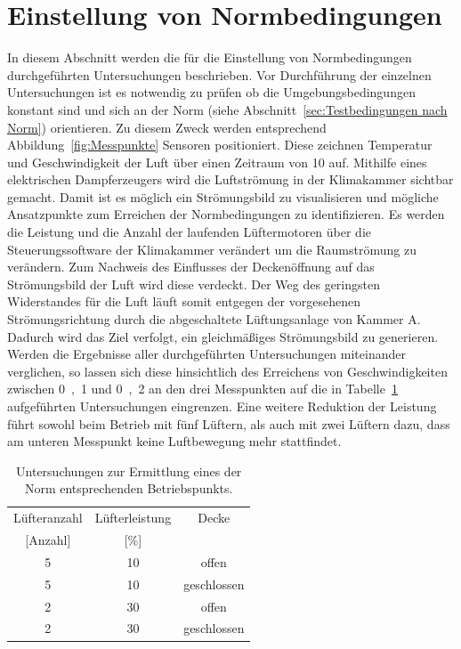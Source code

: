 \section{Einstellung von Normbedingungen}
\label{sec:EinstellungvonNormbedingungen}

In diesem Abschnitt werden die für die Einstellung von Normbedingungen durchgeführten Untersuchungen beschrieben.
Vor Durchführung der einzelnen Untersuchungen ist es notwendig zu prüfen ob die Umgebungsbedingungen konstant sind und sich an der Norm (siehe Abschnitt~\ref{sec:Testbedingungen nach Norm}) orientieren. Zu diesem Zweck werden entsprechend Abbildung~\ref{fig:Messpunkte} Sensoren positioniert. Diese zeichnen Temperatur und Geschwindigkeit der Luft über einen Zeitraum von \unit{10}{\min} auf. Mithilfe eines elektrischen Dampferzeugers wird die Luftströmung in der Klimakammer sichtbar gemacht. Damit ist es möglich ein Strömungsbild zu visualisieren und mögliche Ansatzpunkte zum Erreichen der Normbedingungen zu identifizieren. Es werden die Leistung und die Anzahl der laufenden Lüftermotoren über die Steuerungssoftware der Klimakammer verändert um die Raumströmung zu verändern. Zum Nachweis des Einflusses der Deckenöffnung auf das Strömungsbild der Luft wird diese verdeckt. Der Weg des geringsten Widerstandes für die Luft läuft somit entgegen der vorgesehenen Strömungsrichtung durch die abgeschaltete Lüftungsanlage von Kammer A. Dadurch wird das Ziel verfolgt, ein gleichmäßiges Strömungsbild zu generieren.  \newline
Werden die Ergebnisse aller durchgeführten Untersuchungen miteinander verglichen, so lassen sich diese hinsichtlich des Erreichens von Geschwindigkeiten zwischen \unit{0,1}{\meter\per\second} und \unit{0,2}{\meter\per\second} an den drei Messpunkten auf die in Tabelle~\ref{tab:Lüfterleistungen} aufgeführten Untersuchungen eingrenzen. Eine weitere Reduktion der Leistung führt sowohl beim Betrieb mit fünf Lüftern, als auch mit zwei Lüftern dazu, dass am unteren Messpunkt keine Luftbewegung mehr stattfindet. 

\begin{table}[h!]
\centering
\caption{Untersuchungen zur Ermittlung eines der Norm entsprechenden Betriebspunkts.}
\label{tab:Lüfterleistungen}
\begin{tabular}{|ccc|}
\hline
Lüfteranzahl            & Lüfterleistung          & Decke       \\
{[}Anzahl{]}            & {[}\%{]}                &             \\ \hline
\multicolumn{1}{|c|}{5} & \multicolumn{1}{c|}{10} & offen       \\
\multicolumn{1}{|c|}{5} & \multicolumn{1}{c|}{10} & geschlossen \\
\multicolumn{1}{|c|}{2} & \multicolumn{1}{c|}{30} & offen       \\
\multicolumn{1}{|c|}{2} & \multicolumn{1}{c|}{30} & geschlossen \\ \hline
\end{tabular}
\end{table}

